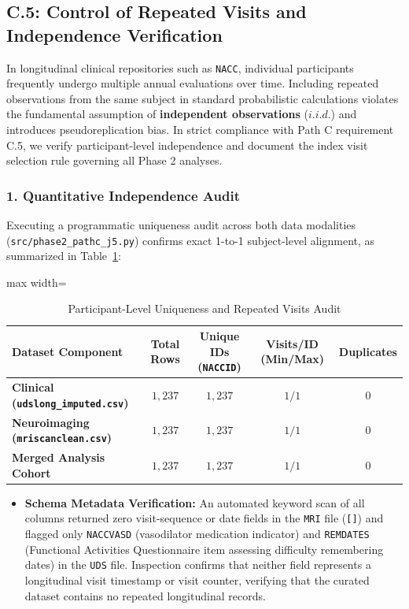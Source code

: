 \documentclass[11pt, a4paper]{article}
\begin{document}
\subsection{C.5: Control of Repeated Visits and Independence Verification}
In longitudinal clinical repositories such as \texttt{NACC}, individual participants frequently undergo multiple annual evaluations over time. Including repeated observations from the same subject in standard probabilistic calculations violates the fundamental assumption of \textbf{independent observations} ($i.i.d.$) and introduces pseudoreplication bias. In strict compliance with Path C requirement C.5, we verify participant-level independence and document the index visit selection rule governing all Phase 2 analyses.

\subsubsection*{1. Quantitative Independence Audit}
Executing a programmatic uniqueness audit across both data modalities (\texttt{src/phase2\_pathc\_j5.py}) confirms exact 1-to-1 subject-level alignment, as summarized in Table~\ref{tab:pathc_c5}:

\begin{table}[H]
\centering
\caption{Participant-Level Uniqueness and Repeated Visits Audit}
\label{tab:pathc_c5}
\begin{adjustbox}{max width=\textwidth}
\small
\setlength{\tabcolsep}{5pt}
\begin{tabular}{lcccc}
\toprule
\textbf{Dataset Component} & \textbf{Total Rows} & \textbf{Unique IDs (\texttt{NACCID})} & \textbf{Visits/ID (Min/Max)} & \textbf{Duplicates} \\
\midrule
\textbf{Clinical (\texttt{udslong\_imputed.csv})} & $1,237$ & $1,237$ & $1 / 1$ & $0$ \\
\textbf{Neuroimaging (\texttt{mriscanclean.csv})} & $1,237$ & $1,237$ & $1 / 1$ & $0$ \\
\textbf{Merged Analysis Cohort} & $1,237$ & $1,237$ & $1 / 1$ & $0$ \\
\bottomrule
\end{tabular}
\end{adjustbox}
\end{table}

\begin{itemize}
    \item \textbf{Schema Metadata Verification:} An automated keyword scan of all columns returned zero visit-sequence or date fields in the \texttt{MRI} file (\texttt{[]}) and flagged only \texttt{NACCVASD} (vasodilator medication indicator) and \texttt{REMDATES} (Functional Activities Questionnaire item assessing difficulty remembering dates) in the \texttt{UDS} file. Inspection confirms that neither field represents a longitudinal visit timestamp or visit counter, verifying that the curated dataset contains no repeated longitudinal records.
\end{itemize}
\end{document}
